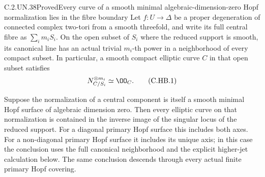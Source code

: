 \begin{statement}{C.2.UN.38}{Proved}{Every curve of a smooth minimal algebraic-dimension-zero Hopf normalization lies in the fibre boundary}
Let $f:U\to\Delta$ be a proper degeneration of
connected complex two-tori from a smooth threefold,
and write its full central fibre as $\sum_i m_iS_i$.
On the open subset of $S_i$ where the reduced
support is smooth, its canonical line has an
actual trivial $m_i$-th power in a neighborhood
of every compact subset. In particular, a
smooth compact elliptic curve $C$ in that open
subset satisfies
\[
                         N_{C/S_i}^{\otimes m_i}
                                      \simeq\OO_C.    \tag{C.HB.1}
\]

Suppose the normalization of a central component
is itself a smooth minimal Hopf surface of
algebraic dimension zero. Then every elliptic
curve on that normalization is contained in
the inverse image of the singular locus of
the reduced support. For a diagonal primary
Hopf surface this includes both axes. For a
non-diagonal primary Hopf surface it includes
its unique axis; in this case the conclusion
uses the full canonical neighborhood and
the explicit higher-jet calculation below.
The same conclusion descends through every
actual finite primary Hopf covering.
\end{statement}


